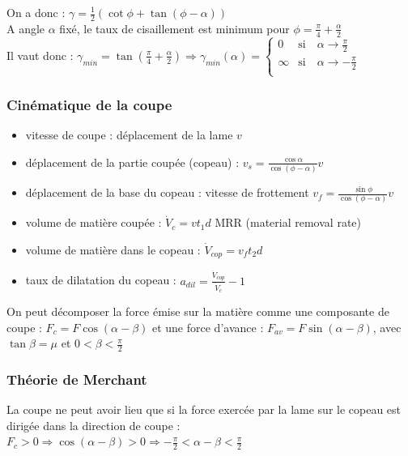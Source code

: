 \documentclass[../main.tex]{subfiles}
\begin{document}
On a donc : $\gamma = \frac{1}{2}(\cot{\phi} + \tan(\phi - \alpha))$\\

A angle $\alpha$ fixé, le taux de cisaillement est minimum pour $\phi = \frac{\pi}{4} + \frac{\alpha}{2}$\\
Il vaut donc : $\gamma_{min} = \tan(\frac{\pi}{4} + \frac{\alpha}{2}) \Rightarrow \gamma_{min}(\alpha) = \begin{cases}
    0 & \text{si}\quad \alpha \rightarrow \frac{\pi}{2}\\
    \infty & \text{si}\quad \alpha \rightarrow -\frac{\pi}{2}\\
\end{cases}$

\subsubsection{Cinématique de la coupe}
\begin{itemize}
    \item vitesse de coupe : déplacement de la lame $v$\\
    \item déplacement de la partie coupée (copeau) : $v_s = \frac{\cos{\alpha}}{\cos(\phi-\alpha)}v$\\
    \item déplacement de la base du copeau : vitesse de frottement $v_f = \frac{\sin{\phi}}{\cos(\phi-\alpha)}v$\\
    \item volume de matière coupée : $\dot{V}_c = vt_1 d $ MRR (material removal rate)\\
    \item volume de matière dans le copeau : $\dot{V}_{cop} = v_f t_2 d$\\
    \item taux de dilatation du copeau : $a_{dil} = \frac{\dot{V}_{cop}}{\dot{V}_c}-1$\\
\end{itemize}

On peut décomposer la force émise sur la matière comme une composante de coupe : $F_c = F \cos(\alpha-\beta)$ et une force d'avance : $F_{av} = F\sin(\alpha-\beta)$, avec $\tan{\beta} = \mu$ et $0<\beta<\frac{\pi}{2}$\\

\subsubsection{Théorie de Merchant}
La coupe ne peut avoir lieu que si la force exercée par la lame sur le copeau est dirigée dans la direction de coupe : $F_c>0 \Rightarrow \cos(\alpha-\beta) >0 \Rightarrow -\frac{\pi}{2}<\alpha-\beta<\frac{\pi}{2}$\\
\end{document}
